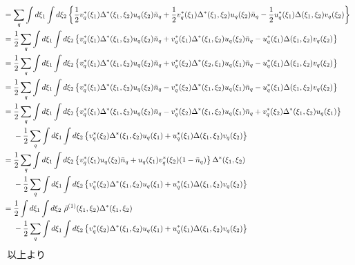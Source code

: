 \documentclass[dvipdfmx, 11pt, a4paper]{jsarticle}
\numberwithin{equation}{section}
\theoremstyle{definition}
\begin{document}
\begin{derivationBox}
\begin{align}
            &= \sum_q \int d\xi_1 \int d\xi_2 \left\{ \frac{1}{2}v^*_q(\xi_1)\Delta^* (\xi_1,\xi_2)   u_q(\xi_2) \bar{n}_q + \frac{1}{2}v^*_q(\xi_1)\Delta^* (\xi_1,\xi_2)   u_q(\xi_2) \bar{n}_q - \frac{1}{2} u_q^*(\xi_1)\Delta(\xi_1,\xi_2)v_q(\xi_2) \right\} \notag \\
            &= \frac{1}{2}\sum_q \int d\xi_1 \int d\xi_2 \left\{ v^*_q(\xi_1)\Delta^* (\xi_1,\xi_2)   u_q(\xi_2) \bar{n}_q + v^*_q(\xi_1)\Delta^* (\xi_1,\xi_2)   u_q(\xi_2) \bar{n}_q -  u_q^*(\xi_1)\Delta(\xi_1,\xi_2)v_q(\xi_2) \right\} \notag \\
            &= \frac{1}{2}\sum_q \int d\xi_1 \int d\xi_2 \left\{ v^*_q(\xi_1)\Delta^* (\xi_1,\xi_2)   u_q(\xi_2) \bar{n}_q + v^*_q(\xi_2)\Delta^* (\xi_2,\xi_1)   u_q(\xi_1) \bar{n}_q -  u_q^*(\xi_1)\Delta(\xi_1,\xi_2)v_q(\xi_2) \right\} \notag \\
            &= \frac{1}{2}\sum_q \int d\xi_1 \int d\xi_2 \left\{ v^*_q(\xi_1)\Delta^* (\xi_1,\xi_2)   u_q(\xi_2) \bar{n}_q - v^*_q(\xi_2)\Delta^* (\xi_1,\xi_2)   u_q(\xi_1) \bar{n}_q -  u_q^*(\xi_1)\Delta(\xi_1,\xi_2)v_q(\xi_2) \right\} \notag \\
            &= \frac{1}{2}\sum_q \int d\xi_1 \int d\xi_2 \left\{ v^*_q(\xi_1)\Delta^* (\xi_1,\xi_2)   u_q(\xi_2) \bar{n}_q - v^*_q(\xi_2)\Delta^* (\xi_1,\xi_2)   u_q(\xi_1) \bar{n}_q + v^*_q(\xi_2)\Delta^* (\xi_1,\xi_2)   u_q(\xi_1)\right\} \notag \\
            &\ \ \ \ - \frac{1}{2}\sum_q \int d\xi_1 \int d\xi_2 \left\{v^*_q(\xi_2)\Delta^* (\xi_1,\xi_2)   u_q(\xi_1) +  u_q^*(\xi_1)\Delta(\xi_1,\xi_2)v_q(\xi_2) \right\} \notag \\
            &= \frac{1}{2}\sum_q \int d\xi_1 \int d\xi_2 \left\{ v^*_q(\xi_1)   u_q(\xi_2) \bar{n}_q + u_q(\xi_1)v^*_q(\xi_2) (1-\bar{n}_q)      \right\}\Delta^* (\xi_1,\xi_2) \notag \\
            &\ \ \ \ - \frac{1}{2}\sum_q \int d\xi_1 \int d\xi_2 \left\{v^*_q(\xi_2)\Delta^* (\xi_1,\xi_2)   u_q(\xi_1) +  u_q^*(\xi_1)\Delta(\xi_1,\xi_2)v_q(\xi_2) \right\} \notag \\
            &= \frac{1}{2} \int d\xi_1 \int d\xi_2\ \tilde{\rho}^{(1)}(\xi_1,\xi_2)\Delta^* (\xi_1,\xi_2) \notag \\
            &\ \ \ \ - \frac{1}{2}\sum_q \int d\xi_1 \int d\xi_2 \left\{v^*_q(\xi_2)\Delta^* (\xi_1,\xi_2)   u_q(\xi_1) +  u_q^*(\xi_1)\Delta(\xi_1,\xi_2)v_q(\xi_2) \right\}
        \end{align}
        $\ \ $以上より
        \begin{align}

\end{align}
\end{derivationBox}
\end{document}
